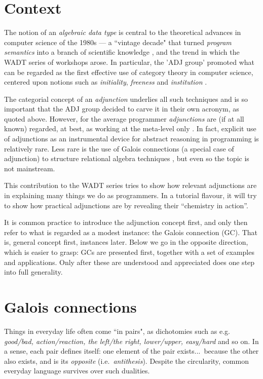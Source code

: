 \documentclass{elsarticle}
\begin{document}
\section{Context}
The notion of an \emph{algebraic data type} is central to the theoretical
advances in computer science of the 1980s --- a ``vintage decade" that turned
\emph{program semantics} into a branch of scientific knowledge \cite{BG82,BL84},
and the trend in which the WADT series of workshops arose. In particular, the 'ADJ
group' promoted what can be regarded as the first effective use of category
theory in computer science, centered upon notions such as \emph{initiality},
\emph{freeness} and 
\emph{institution} \cite{BG82,GB92}.

The categorial concept of an \emph{adjunction} \cite{Ma71} underlies all such techniques
and is so important that the ADJ group decided to carve it in their own acronym,
as quoted above. However, for the average programmer \emph{adjunctions}
are (if at all known) regarded, at best, as working at
the meta-level only \cite{GB92}. In fact, explicit use of {adjunctions}
as an instrumental device for abstract reasoning in programming is relatively
rare. Less rare is the use of Galois connections (a special case of adjunction)
to structure relational algebra techniques \cite{BB04,Ba04a}, but even so the
topic is not mainstream.

This contribution to the WADT series tries to show how relevant adjunctions are in
explaining many things we do as programmers. In a tutorial flavour,  it will try to
show how practical adjunctions are by revealing their ``chemistry in action''.

It is common practice to introduce the adjunction concept first, and only then
refer to what is regarded as a modest instance: the Galois connection (GC).
That is, general concept first, instances later.
Below we go in the opposite direction, which is easier to grasp: GCs are presented
first, together with a set of examples and applications. Only after these are understood 
and appreciated does one step into full generality.

\section{Galois connections}
Things in everyday life often come ``in pairs", as dichotomies such as
e.g.\ \emph{ good/bad, action/reaction, the left/the right, lower/upper, {easy}/{hard}}
and so on.
In a sense, each pair defines itself: one element of the pair exists...\ because
the other also exists, and is its \emph{opposite} (i.e.\ \emph{antithesis}).
Despite the circularity, common everyday language survives over such dualities.
%
\end{document}
